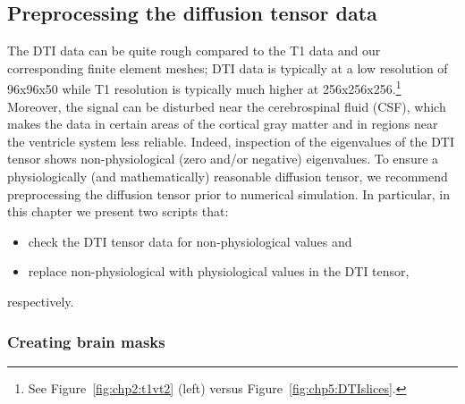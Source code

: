 \subsection{Preprocessing the diffusion tensor data}

The DTI data can be quite rough compared to the T1 data and our
corresponding finite element meshes; DTI data is typically at a low resolution 
of 96x96x50 while T1 resolution is typically much higher at 
256x256x256.\footnote{See Figure~\ref{fig:chp2:t1vt2} (left) versus 
Figure~\ref{fig:chp5:DTIslices}.} Moreover, the signal can be disturbed near 
the cerebrospinal fluid (CSF), which makes the data in certain areas of the 
cortical gray matter and in regions near the ventricle system less reliable. 
Indeed, inspection of the eigenvalues of the DTI tensor shows 
non-physiological (zero and/or negative) eigenvalues. To ensure a 
physiologically (and mathematically) reasonable diffusion tensor, we recommend 
preprocessing the diffusion tensor prior to numerical simulation. In 
particular, in this chapter we present two scripts that:
\begin{itemize}
\item
  check the DTI tensor data for non-physiological values and
\item
  replace non-physiological with physiological values in the DTI tensor,
\end{itemize}
respectively.

\subsubsection*{Creating brain masks}

